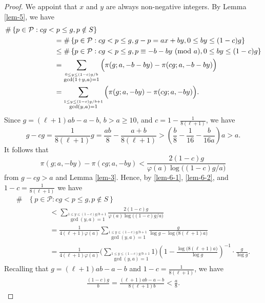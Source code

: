 \documentclass[12pt,a4paper,reqno]{amsart}
\numberwithin{equation}{section}
\def\pmod #1{\ ({\rm{mod}}\ #1)}
\def\cP{{\mathcal P}}
\theoremstyle{plain}
\theoremstyle{definition}
\begin{document}
 \begin{proof}
 	We appoint that $x$ and $y$ are always non-negative integers. By Lemma \ref{lem-5}, we have
 	\begin{align}\label{lem-6-1}
 		\#&\left\{p\in\cP:cg< p\leq g, p\notin S \right\}\nonumber\\
 		&\quad\quad\quad\quad\quad\quad=\#\left\{p\in\cP:cg< p\leq g, g-p=ax+by,0\leq by\leq (1-c)g\right\}\nonumber\\
 		&\quad\quad\quad\quad\quad\quad\leq \#\left\{p\in \cP: cg< p\leq g,p\equiv -b-by \pmod{a}, 0\leq by\leq (1-c)g \right\}\nonumber\\
 		&\quad\quad\quad\quad\quad\quad=\sum_{\stackrel{0\leq y\leq (1-c)g/b}{\gcd(1+y,a)=1}} \Big( \pi(g;a,-b-by)-\pi(cg;a,-b-by) \Big)\nonumber\\
 		&\quad\quad\quad\quad\quad\quad=\sum_{\stackrel{1\leq y\leq (1-c)g/b+1}{\gcd(y,a)=1} }\Big( \pi(g;a,-by)-\pi(cg;a,-by) \Big).
 	\end{align}
 	Since $g=(\ell+1)ab-a-b$, $b>a\geq 10$, and $c=1-\frac{1}{8(\ell+1)}$, we have 
 	$$
 	g-cg=\frac{1}{8(\ell+1)}g=\frac{ab}{8}-\frac{a+b}{8(\ell+1)}
 	>\left( \frac{b}{8}-\frac{1}{16}-\frac{b}{16a}\right)a
 	>a.
 	$$
 	It follows that
 	\begin{equation}\label{lem-6-2}
 		\pi(g;a,-by)-\pi(cg;a,-by)<\frac{2(1-c)g}{\varphi(a)\log\big((1-c)g/a\big)}
 	\end{equation}
 	from $g-cg>a$ and Lemma \ref{lem-3}.
 	Hence, by \eqref{lem-6-1}, \eqref{lem-6-2}, and $1-c=\frac{1}{8(\ell+1)}$ we have
 	\begin{align}\label{lem-6-3}
 	 \#&\left\{p\in\cP:cg< p\leq g, p\notin S \right\}\nonumber\\
 		&\quad\quad\quad<\sum_{\stackrel{1\leq y\leq (1-c)g/b+1}{\gcd(y,a)=1} } \frac{2(1-c)g}{\varphi(a)\log\big((1-c)g/a\big)}\nonumber\\
 		&\quad\quad\quad=\frac{1}{4(\ell+1)\varphi(a)}\sum_{\stackrel{1\leq y\leq (1-c)g/b+1}{\gcd(y,a)=1} } \frac{g}{\log g-\log \big(8(\ell+1)a\big)}\nonumber\\
 		&\quad\quad\quad=\frac{1}{4(\ell+1)\varphi(a)}\Bigg(\sum_{\stackrel{1\leq y\leq (1-c)g/b+1}{\gcd(y,a)=1}}1\Bigg)\left(1-\frac{\log\big(8(\ell+1)a\big)}{\log g}\right)^{-1}\cdot\frac{g}{\log g}.
 	\end{align}
 	Recalling that $g=(\ell+1)ab-a-b$ and $1-c=\frac{1}{8(\ell+1)}$, we have
 	\begin{align}\label{lem-6-4}
 	\frac{(1-c)g}{b}=\frac{(\ell+1)ab-a-b}{8(\ell+1)b}<\frac{a}{8}.
 	\end{align}

\end{proof}
\end{document}
